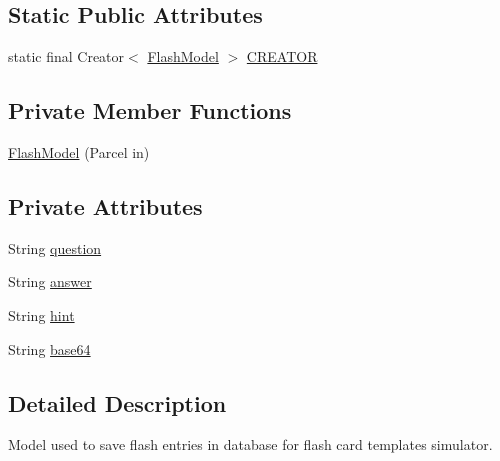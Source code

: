 \subsection*{Static Public Attributes}
\begin{DoxyCompactItemize}
\item 
static final Creator$<$ \hyperlink{classorg_1_1buildmlearn_1_1toolkit_1_1flashcardtemplate_1_1data_1_1FlashModel}{Flash\+Model} $>$ \hyperlink{classorg_1_1buildmlearn_1_1toolkit_1_1flashcardtemplate_1_1data_1_1FlashModel_afd4b62c200855dfb7c24f6dbfb418602}{C\+R\+E\+A\+T\+OR}
\end{DoxyCompactItemize}
\subsection*{Private Member Functions}
\begin{DoxyCompactItemize}
\item 
\hyperlink{classorg_1_1buildmlearn_1_1toolkit_1_1flashcardtemplate_1_1data_1_1FlashModel_ad6864daae9d6727c3ad5064e03d9bc84}{Flash\+Model} (Parcel in)
\end{DoxyCompactItemize}
\subsection*{Private Attributes}
\begin{DoxyCompactItemize}
\item 
String \hyperlink{classorg_1_1buildmlearn_1_1toolkit_1_1flashcardtemplate_1_1data_1_1FlashModel_ad1d14b3ffb4c0f780eb6701b527c37f7}{question}
\item 
String \hyperlink{classorg_1_1buildmlearn_1_1toolkit_1_1flashcardtemplate_1_1data_1_1FlashModel_a65d3cf084a4b9c5ffc19c55280605820}{answer}
\item 
String \hyperlink{classorg_1_1buildmlearn_1_1toolkit_1_1flashcardtemplate_1_1data_1_1FlashModel_aef87096d3d6ab0b6cdc78728f24ac64c}{hint}
\item 
String \hyperlink{classorg_1_1buildmlearn_1_1toolkit_1_1flashcardtemplate_1_1data_1_1FlashModel_ac0267eafa18f0fc947a1b7659fae1356}{base64}
\end{DoxyCompactItemize}


\subsection{Detailed Description}
Model used to save flash entries in database for flash card template\textquotesingle{}s simulator. 

